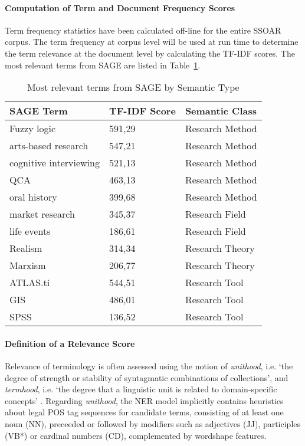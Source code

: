 \paragraph{Computation of Term and Document Frequency Scores}%
Term frequency statistics have been calculated off-line for the entire SSOAR corpus.
The term frequency at corpus level will be used at run time to determine the term relevance at the document level by calculating the TF-IDF scores. The most relevant terms from SAGE are listed in Table~\ref{tab:SAGET}.
\begin{table}
\center
\small
  \caption{Most relevant terms from SAGE by Semantic Type}
\begin{tabular}{lll}
  \label{tab:SAGET}
  \textbf{SAGE Term} & \textbf{TF-IDF Score}  & \textbf{Semantic Class}   \\ \hline  
Fuzzy logic	  &	591,29  &		Research Method  \\
arts-based research	 &	547,21  &		Research Method \\
cognitive interviewing  &		521,13  &		Research Method \\  
QCA	 &	463,13  &		Research Method   \\ 
oral history	 &	399,68  &		Research Method \\ \hline  
market research  &		345,37  &		Research Field \\
life events  &		186,61  &		Research Field \\ \hline 
Realism  &		314,34  &		Research Theory \\
Marxism  &		206,77  &		Research Theory \\ \hline  
ATLAS.ti  &		544,51  &		Research Tool\\
GIS	 &	486,01  &		Research Tool\\
SPSS	  &	136,52  &		Research Tool \\ \hline  
  
\end{tabular}
\end{table}


\paragraph{Definition of a Relevance Score}%
\label{para:relscore}
Relevance of terminology is often assessed using the notion of 
\textit{unithood}, i.e. `the degree of strength or stability of syntagmatic combinations of collections', and 
\textit{termhood}, i.e. `the degree that a linguistic unit is related to domain-specific concepts' \cite{kageura1996methods}.
Regarding \textit{unithood}, the NER model implicitly contains heuristics about legal POS tag sequences for candidate terms, 
consisting of at least one noun (NN), preceeded or followed by modifiers such as adjectives (JJ), participles (VB*) or cardinal numbers (CD), complemented by wordshape features.


